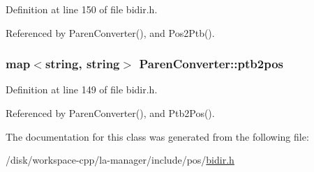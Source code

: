 Definition at line 150 of file bidir.h.

Referenced by ParenConverter(), and Pos2Ptb().\hypertarget{classParenConverter_7b670a720f3c2f0c72fdd04359140bcd}{
\subsubsection[{ptb2pos}]{\setlength{\rightskip}{0pt plus 5cm}map$<$string, string$>$ {\bf ParenConverter::ptb2pos}}}
\label{classParenConverter_7b670a720f3c2f0c72fdd04359140bcd}




Definition at line 149 of file bidir.h.

Referenced by ParenConverter(), and Ptb2Pos().

The documentation for this class was generated from the following file:\begin{CompactItemize}
\item 
/disk/workspace-cpp/la-manager/include/pos/\hyperlink{bidir_8h}{bidir.h}\end{CompactItemize}
